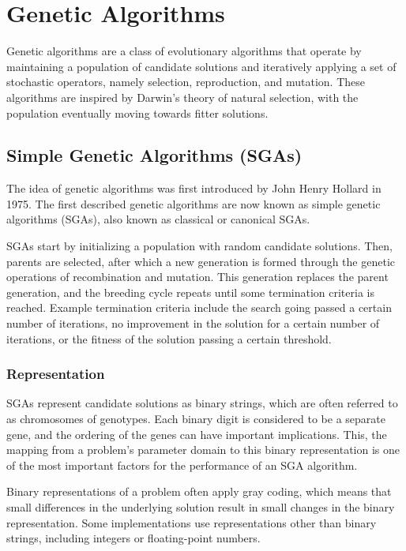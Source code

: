\documentclass[12pt,titlepage]{article}
\begin{document}
  \newpage

  \section{Genetic Algorithms}
    Genetic algorithms are a class of evolutionary algorithms that operate by maintaining a population of candidate solutions and iteratively applying a set of stochastic operators,
    namely selection, reproduction, and mutation. These algorithms are inspired by Darwin's theory of natural selection, with the population eventually moving towards fitter solutions.

    \subsection{Simple Genetic Algorithms (SGAs)}
      The idea of genetic algorithms was first introduced by John Henry Hollard in 1975. The first described genetic algorithms are now known as simple genetic algorithms (SGAs), also
      known as classical or canonical SGAs.

      SGAs start by initializing a population with random candidate solutions. Then, parents are selected, after which a new generation is formed through the genetic operations of
      recombination and mutation. This generation replaces the parent generation, and the breeding cycle repeats until some termination criteria is reached. Example termination
      criteria include the search going passed a certain number of iterations, no improvement in the solution for a certain number of iterations, or the fitness of the solution
      passing a certain threshold.

      \subsubsection{Representation}
        SGAs represent candidate solutions as binary strings, which are often referred to as chromosomes of genotypes. Each binary digit is considered to be a separate gene, and
        the ordering of the genes can have important implications. This, the mapping from a problem's parameter domain to this binary representation is one of the most important
        factors for the performance of an SGA algorithm.

        Binary representations of a problem often apply gray coding, which means that small differences in the underlying solution result in small changes in the binary
        representation. Some implementations use representations other than binary strings, including integers or floating-point numbers.
\end{document}

